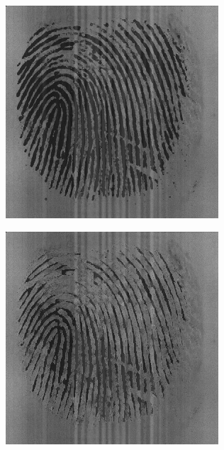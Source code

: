 \documentclass{beamer}
\begin{document}
{\begin{figure}[!ht]
\begin{subfigure}[ht]{0.15\textwidth}
        \end{subfigure}
    \end{figure}
    \begin{figure}[!ht]
        \centering
        \begin{subfigure}[ht]{0.15\textwidth}
            \includegraphics[width=\textwidth]{fingerprints/2002Db3a/1_2_src.jpg}
        \end{subfigure}
        \qquad
        \begin{subfigure}[ht]{0.15\textwidth}
            \includegraphics[width=\textwidth]{fingerprints/2002Db3a/1_2_background.jpg}

\end{subfigure}
\end{figure}}
\end{document}
